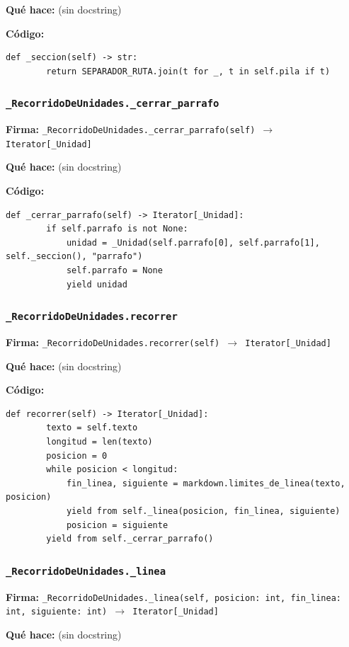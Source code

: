 \documentclass[11pt,a4paper]{article}
\begin{document}
\textbf{Qué hace:} (sin docstring)

\textbf{Código:}
\begin{lstlisting}
def _seccion(self) -> str:
        return SEPARADOR_RUTA.join(t for _, t in self.pila if t)
\end{lstlisting}

\subsubsection*{\texttt{\_RecorridoDeUnidades.\_cerrar\_parrafo}}
\textbf{Firma:} \texttt{\_RecorridoDeUnidades.\_cerrar\_parrafo(self) $\rightarrow$ Iterator[\_Unidad]}

\textbf{Qué hace:} (sin docstring)

\textbf{Código:}
\begin{lstlisting}
def _cerrar_parrafo(self) -> Iterator[_Unidad]:
        if self.parrafo is not None:
            unidad = _Unidad(self.parrafo[0], self.parrafo[1], self._seccion(), "parrafo")
            self.parrafo = None
            yield unidad
\end{lstlisting}

\subsubsection*{\texttt{\_RecorridoDeUnidades.recorrer}}
\textbf{Firma:} \texttt{\_RecorridoDeUnidades.recorrer(self) $\rightarrow$ Iterator[\_Unidad]}

\textbf{Qué hace:} (sin docstring)

\textbf{Código:}
\begin{lstlisting}
def recorrer(self) -> Iterator[_Unidad]:
        texto = self.texto
        longitud = len(texto)
        posicion = 0
        while posicion < longitud:
            fin_linea, siguiente = markdown.limites_de_linea(texto, posicion)
            yield from self._linea(posicion, fin_linea, siguiente)
            posicion = siguiente
        yield from self._cerrar_parrafo()
\end{lstlisting}

\subsubsection*{\texttt{\_RecorridoDeUnidades.\_linea}}
\textbf{Firma:} \texttt{\_RecorridoDeUnidades.\_linea(self, posicion: int, fin\_linea: int, siguiente: int) $\rightarrow$ Iterator[\_Unidad]}

\textbf{Qué hace:} (sin docstring)
\end{document}
